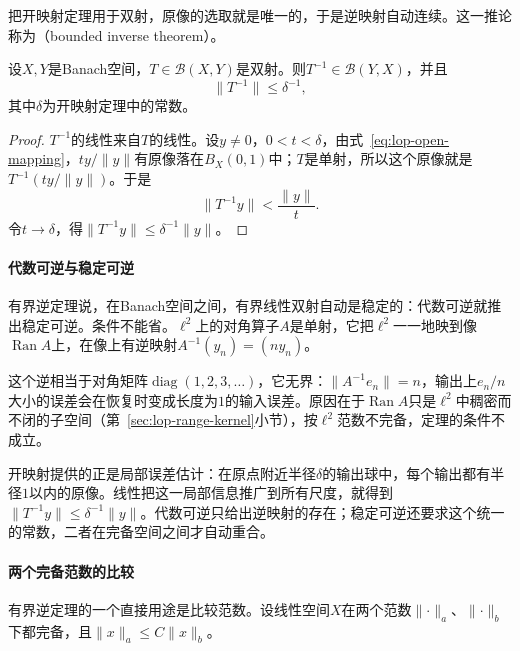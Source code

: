 把开映射定理用于双射，原像的选取就是唯一的，于是逆映射自动连续。这一推论称为（bounded inverse theorem）。

\begin{theorem}[有界逆定理]
\label{thm:lop-bounded-inverse}
设$X,Y$是Banach空间，$T\in\mathcal B(X,Y)$是双射。则$T^{-1}\in\mathcal B(Y,X)$，并且
\begin{equation}
 \lVert T^{-1}\rVert\leq\delta^{-1},
 \label{eq:lop-bounded-inverse}
\end{equation}
其中$\delta$为开映射定理中的常数。
\end{theorem}

\begin{proof}
$T^{-1}$的线性来自$T$的线性。设$y\neq0$，$0<t<\delta$，由式~\eqref{eq:lop-open-mapping}，$ty/\lVert y\rVert$有原像落在$B_X(0,1)$中；$T$是单射，所以这个原像就是$T^{-1}(ty/\lVert y\rVert)$。于是
\[
 \lVert T^{-1}y\rVert<\frac{\lVert y\rVert}{t}.
\]
令$t\to\delta$，得$\lVert T^{-1}y\rVert\leq\delta^{-1}\lVert y\rVert$。
\end{proof}

\paragraph{代数可逆与稳定可逆}
有界逆定理说，在Banach空间之间，有界线性双射自动是稳定的：代数可逆就推出稳定可逆。条件不能省。$\ell^2$上的对角算子$A$是单射，它把$\ell^2$一一地映到像$\operatorname{Ran}A$上，在像上有逆映射$A^{-1}(y_n)=(ny_n)$。

这个逆相当于对角矩阵$\operatorname{diag}(1,2,3,\ldots)$，它无界：$\lVert A^{-1}e_n\rVert=n$，输出上$e_n/n$大小的误差会在恢复时变成长度为$1$的输入误差。原因在于$\operatorname{Ran}A$只是$\ell^2$中稠密而不闭的子空间（第~\ref{sec:lop-range-kernel}小节），按$\ell^2$范数不完备，定理的条件不成立。

开映射提供的正是局部误差估计：在原点附近半径$\delta$的输出球中，每个输出都有半径$1$以内的原像。线性把这一局部信息推广到所有尺度，就得到$\lVert T^{-1}y\rVert\leq\delta^{-1}\lVert y\rVert$。代数可逆只给出逆映射的存在；稳定可逆还要求这个统一的常数，二者在完备空间之间才自动重合。

\paragraph{两个完备范数的比较}
有界逆定理的一个直接用途是比较范数。设线性空间$X$在两个范数$\lVert\cdot\rVert_a$、$\lVert\cdot\rVert_b$下都完备，且$\lVert x\rVert_a\leq C\lVert x\rVert_b$。

